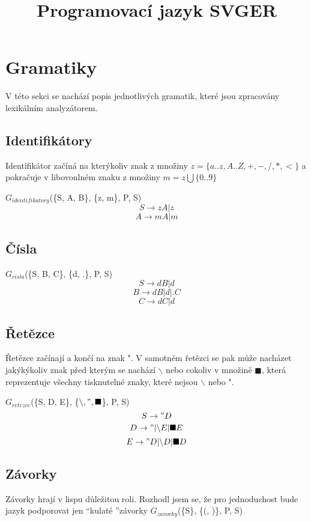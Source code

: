 \documentclass[a4paper,11pt]{article}
\title{Programovací jazyk SVGER}
\begin{document}
\maketitle

\newpage
\tableofcontents

\newpage
\section{Gramatiky}
V této sekci se nachází popis jednotlivých gramatik, které jsou zpracovány lexikálním analyzátorem.

\subsection{Identifikátory}
Identifikátor začíná na kterýkoliv znak z množiny $z = \{a..z, A..Z, +, -, /, *, <\}$
a pokračuje v libovonlném znaku z množiny $m = z \bigcup \{0..9\}$ 
\linebreak

$G_{identifikatory}$(\{S, A, B\}, \{z, m\}, P, S)
$$S \rightarrow zA | z$$
$$A \rightarrow mA | m$$

\subsection{Čísla}
$G_{cisla}$(\{S, B, C\}, \{d, .\}, P, S)
$$S \rightarrow dB | d$$
$$B \rightarrow dB | d | .C$$
$$C \rightarrow dC | d$$

\subsection{Řetězce}
Řetězce začínají a končí na znak ". V samotném řetězci se pak může nacházet jakýkýkoliv znak před kterým se nachází $\backslash$ nebo cokoliv v množině $\blacksquare$, která reprezentuje všechny tisknutelné znaky, které nejsou $\backslash$ nebo ".

$G_{retezce}$(\{S, D, E\}, \{$\backslash, ", \blacksquare$\}, P, S)
$$S \rightarrow "D$$
$$D \rightarrow " | \backslash E | \blacksquare E$$
$$E \rightarrow "D | \backslash D | \blacksquare D$$

\subsection{Závorky}
Závorky hrají v lispu důležitou roli. Rozhodl jsem se, že pro jednoduchost bude jazyk podporovat jen \textquotedblleft kulaté \textquotedblright závorky
$G_{zavorky}$(\{S\}, \{(, )\}, P, S)
\end{document}
